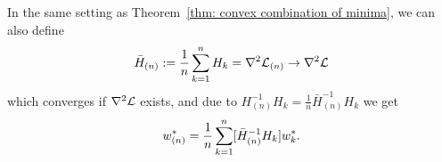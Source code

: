 \begin{corollary}
	In the same setting as Theorem~\ref{thm: convex combination of minima}, we
	can also define
	\begin{align*}
		\bar{H}_{(n)} := \frac1n\sum_{k=1}^n H_k = \nabla^2\mathcal{L}_{(n)} \to \nabla^2\mathcal{L}
	\end{align*}
	which converges if \(\nabla^2\mathcal{L}\) exists, and due to \(H_{(n)}^{-1}H_k =
	\tfrac1n\bar{H}_{(n)}^{-1}H_k\) we get
	\begin{align*}
		w^*_{(n)}
		= \frac1n\sum_{k=1}^n [\bar{H}_{(n)}^{-1} H_k] w^*_{k}.
	\end{align*}
\end{corollary}

